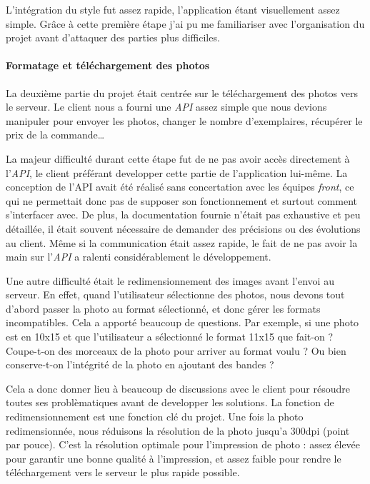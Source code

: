 \bigskip

L'intégration du style fut assez rapide, l'application étant
visuellement assez simple. Grâce à cette première étape j'ai pu me
familiariser avec l'organisation du projet avant d'attaquer des parties
plus difficiles.

\bigskip

\paragraph{Formatage et téléchargement des
photos}\label{formatage-et-tuxe9luxe9chargement-des-photos}

\bigskip

La deuxième partie du projet était centrée sur le téléchargement des
photos vers le serveur. Le client nous a fourni une \emph{API} assez
simple que nous devions manipuler pour envoyer les photos, changer le
nombre d'exemplaires, récupérer le prix de la commande\ldots{}

\bigskip

La majeur difficulté durant cette étape fut de ne pas avoir accès
directement à l'\emph{API}, le client préférant developper cette partie
de l'application lui-même. La conception de l'API avait été réalisé sans
concertation avec les équipes \emph{front}, ce qui ne permettait donc
pas de supposer son fonctionnement et surtout comment s'interfacer avec.
De plus, la documentation fournie n'était pas exhaustive et peu
détaillée, il était souvent nécessaire de demander des précisions ou des
évolutions au client. Même si la communication était assez rapide, le
fait de ne pas avoir la main sur l'\emph{API} a ralenti considérablement
le développement.

\bigskip

Une autre difficulté était le redimensionnement des images avant l'envoi
au serveur. En effet, quand l'utilisateur sélectionne des photos, nous
devons tout d'abord passer la photo au format sélectionné, et donc gérer
les formats incompatibles. Cela a apporté beaucoup de questions. Par
exemple, si une photo est en 10x15 et que l'utilisateur a sélectionné le
format 11x15 que fait-on ? Coupe-t-on des morceaux de la photo pour
arriver au format voulu ? Ou bien conserve-t-on l'intégrité de la photo
en ajoutant des bandes ?

\bigskip

Cela a donc donner lieu à beaucoup de discussions avec le client pour
résoudre toutes ses problèmatiques avant de developper les solutions. La
fonction de redimensionnement est une fonction clé du projet. Une fois
la photo redimensionnée, nous réduisons la résolution de la photo
jusqu'a 300dpi (point par pouce). C'est la résolution optimale pour
l'impression de photo : assez élevée pour garantir une bonne qualité à
l'impression, et assez faible pour rendre le téléchargement vers le
serveur le plus rapide possible.

